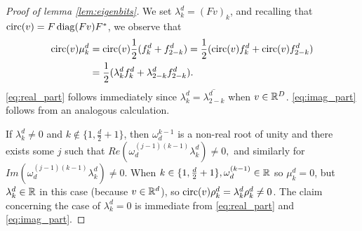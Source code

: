 \begin{proof}[Proof of lemma \ref{lem:eigenbits}]
  We set $\lambda_k^d = (Fv)_k$, and recalling that $\operatorname{circ}(v) = F \operatorname{diag}(F v) F^*$, we observe that \begin{align*}\operatorname{circ}(v) \mu_k^d &= \operatorname{circ}(v) \frac{1}{2} (f_k^d + f_{2 - k}^d) = \frac{1}{2}(\operatorname{circ}(v) f_k^d + \operatorname{circ}(v) f_{2 - k}^d) \\ &= \frac{1}{2}(\lambda_k^d f_k^d + \lambda_{2 - k}^d f_{2 - k}^d).\end{align*}  \eqref{eq:real_part} follows immediately since $\lambda_k^d = \overline{\lambda_{2 - k}^d}$ when $v \in \mathbb{R}^D$.  \eqref{eq:imag_part} follows from an analogous calculation.

  If $\lambda_k^d \neq 0$ and $k \notin \{1, \frac{d}{2} + 1\}$, then $\omega_d^{k - 1}$ is a non-real root of unity and there exists some $j$ such that $Re(\omega_d^{(j - 1)(k - 1)} \lambda_k^d) \neq 0,$ and similarly for $Im(\omega_d^{(j - 1)(k - 1)} \lambda_k^d) \neq 0.$  When $k \in \{1, \frac{d}{2} + 1\}, \omega_d^{(k - 1)} \in \mathbb{R}$ so $\mu_k^d = 0$, but $\lambda_k^d \in \mathbb{R}$ in this case (because $v \in \mathbb{R}^d$), so $\operatorname{circ}(v) \rho_k^d = \lambda_k^d \rho_k^d \neq 0$.  The claim concerning the case of $\lambda_k^d = 0$ is immediate from \eqref{eq:real_part} and \eqref{eq:imag_part}.
\end{proof}

